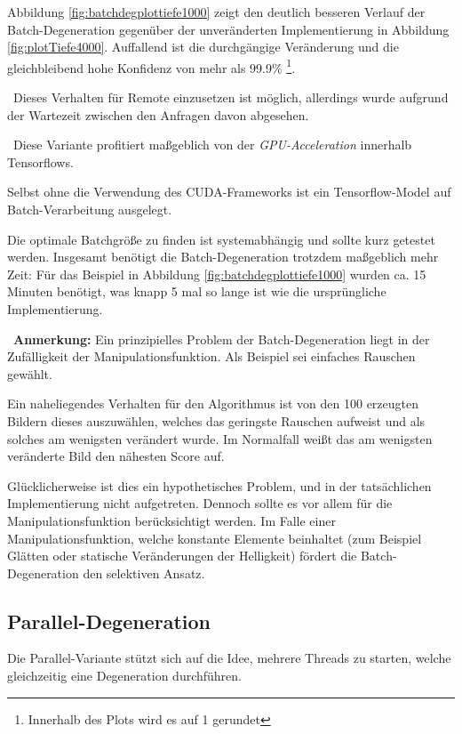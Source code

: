 Abbildung \ref{fig:batchdegplottiefe1000} zeigt den deutlich besseren Verlauf der Batch-Degeneration gegenüber der unveränderten Implementierung in Abbildung \ref{fig:plotTiefe4000}. Auffallend ist die durchgängige Veränderung und die gleichbleibend hohe Konfidenz von mehr als 99.9\% \footnote{Innerhalb des Plots wird es auf 1 gerundet}. 

~\newline Dieses Verhalten für Remote einzusetzen ist möglich, allerdings wurde aufgrund der Wartezeit zwischen den Anfragen davon abgesehen. 

~\newline Diese Variante profitiert maßgeblich von der \textit{GPU-Acceleration} innerhalb Tensorflows. 

Selbst ohne die Verwendung des CUDA-Frameworks ist ein Tensorflow-Model auf Batch-Verarbeitung ausgelegt. 

Die optimale Batchgröße zu finden ist systemabhängig und sollte kurz getestet werden. Insgesamt benötigt die Batch-Degeneration trotzdem maßgeblich mehr Zeit: Für das Beispiel in Abbildung \ref{fig:batchdegplottiefe1000} wurden ca. 15 Minuten benötigt, was knapp 5 mal so lange ist wie die ursprüngliche Implementierung. 

~\newline \textbf{Anmerkung:} Ein prinzipielles Problem der Batch-Degeneration liegt in der Zufälligkeit der Manipulationsfunktion. Als Beispiel sei einfaches Rauschen gewählt. 

Ein naheliegendes Verhalten für den Algorithmus ist von den 100 erzeugten Bildern dieses auszuwählen, welches das geringste Rauschen aufweist und als solches am wenigsten verändert wurde. Im Normalfall weißt das am wenigsten veränderte Bild den nähesten Score auf. 

Glücklicherweise ist dies ein hypothetisches Problem, und in der tatsächlichen Implementierung nicht aufgetreten. Dennoch sollte es vor allem für die Manipulationsfunktion berücksichtigt werden. Im Falle einer Manipulationsfunktion, welche konstante Elemente beinhaltet (zum Beispiel Glätten oder statische Veränderungen der Helligkeit) fördert die Batch-Degeneration den selektiven Ansatz.
\subsection{Parallel-Degeneration}
Die Parallel-Variante stützt sich auf die Idee, mehrere Threads zu starten, welche gleichzeitig eine Degeneration durchführen.

